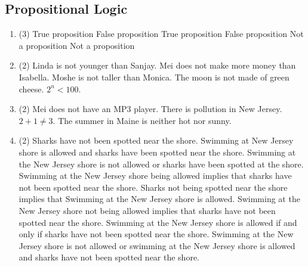 \documentclass[12pt]{article}
\newcommand{\enumset}[1]{\setcounter{enumi}{#1}}
\begin{document}
		\subsection{Propositional Logic}
			\begin{enumerate}
				\item
					\begin{tasks}(3)
						\task
							True proposition
						\task
							False proposition
						\task
							True proposition
						\task
							False proposition
						\task
							Not a proposition
						\task
							Not a proposition
					\end{tasks}
				\enumset{2}
				\item
					\begin{tasks}(2)
						\task
							Linda is not younger than Sanjay.
						\task
							Mei does not make more money than Isabella.
						\task
							Moshe is not taller than Monica.
						\task
							The moon is not made of green cheese.
						\task
							\(2^n < 100\).	
					\end{tasks}
				\enumset{4}
				\item
					\begin{tasks}(2)
						\task
							Mei does not have an MP3 player.
						\task
							There is pollution in New Jersey.
						\task
							\(2 + 1 \ne 3\).
						\task
							The summer in Maine is neither hot nor sunny.	
					\end{tasks}
				\enumset{10}
				\item
					\begin{tasks}(2)
						\task
							Sharks have not been spotted near the shore.
						\task
							Swimming at New Jersey shore is allowed and sharks have been spotted near the shore.
						\task
							Swimming at the New Jersey shore is not allowed or sharks have been spotted at the shore.
						\task
							Swimming at the New Jersey shore being allowed implies that sharks have not been spotted near the shore.
						\task
							Sharks not being spotted near the shore implies that Swimming at the New Jersey shore is allowed.
						\task
							Swimming at the New Jersey shore not being allowed implies that sharks have not been spotted near the shore.
						\task
							Swimming at the New Jersey shore is allowed if and only if sharks have not been spotted near the shore.
						\task
							Swimming at the New Jersey shore is not allowed or swimming at the New Jersey shore is allowed and sharks have not been spotted near the shore.
					\end{tasks}

\end{enumerate}
\end{document}
